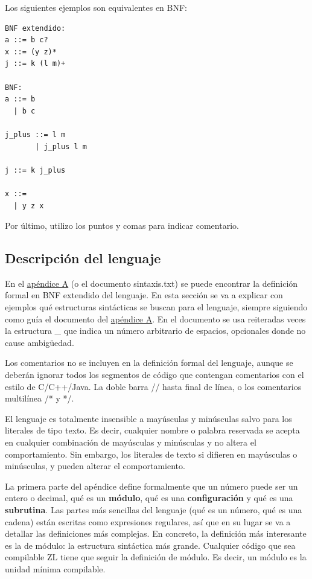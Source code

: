 \documentclass{report}
\begin{document}
	\vspace{10px}
	
	Los siguientes ejemplos son equivalentes en BNF:
	
	\begin{BVerbatim}
BNF extendido:
a ::= b c?
x ::= (y z)*
j ::= k (l m)+
	
BNF:
a ::= b
  | b c

j_plus ::= l m
       | j_plus l m	

j ::= k j_plus

x ::= 
  | y z x
	\end{BVerbatim}
	
	Por último, utilizo los puntos y comas para indicar comentario.
	
	\subsection{Descripción del lenguaje}
	
	En el \hyperref[app:a]{apéndice A} (o el documento sintaxis.txt) se puede encontrar la definición formal en BNF extendido del lenguaje. En esta sección se va a explicar con ejemplos qué estructuras sintácticas se buscan para el lenguaje, siempre siguiendo como guía el documento del \hyperref[app:a]{apéndice A}. En el documento se usa reiteradas veces la estructura \_ que indica un número arbitrario de espacios, opcionales donde no cause ambigüedad. 
	
	\vspace{10px}
	
	Los comentarios no se incluyen en la definición formal del lenguaje, aunque se deberán ignorar todos los segmentos de código que contengan comentarios con el estilo de C/C++/Java. La doble barra // hasta final de línea, o los comentarios multilínea /* y */.
	
	\vspace{10px}
	
	El lenguaje es totalmente insensible a mayúsculas y minúsculas salvo para los literales de tipo texto. Es decir, cualquier nombre o palabra reservada se acepta en cualquier combinación de mayúsculas y minúsculas y no altera el comportamiento. Sin embargo, los literales de texto si difieren en mayúsculas o minúsculas, y pueden alterar el comportamiento.
	
	\vspace{10px}
	
	La primera parte del apéndice define formalmente que un número puede ser un entero o decimal, qué es un \textbf{módulo}, qué es una \textbf{configuración} y qué es una \textbf{subrutina}. Las partes más sencillas del lenguaje (qué es un número, qué es una cadena) están escritas como expresiones regulares, así que en su lugar se va a detallar las definiciones más complejas. En concreto, la definición más interesante es la de módulo: la estructura sintáctica más grande. Cualquier código que sea compilable ZL tiene que seguir la definición de módulo. Es decir, un módulo es la unidad mínima compilable.   
	
\end{document}

